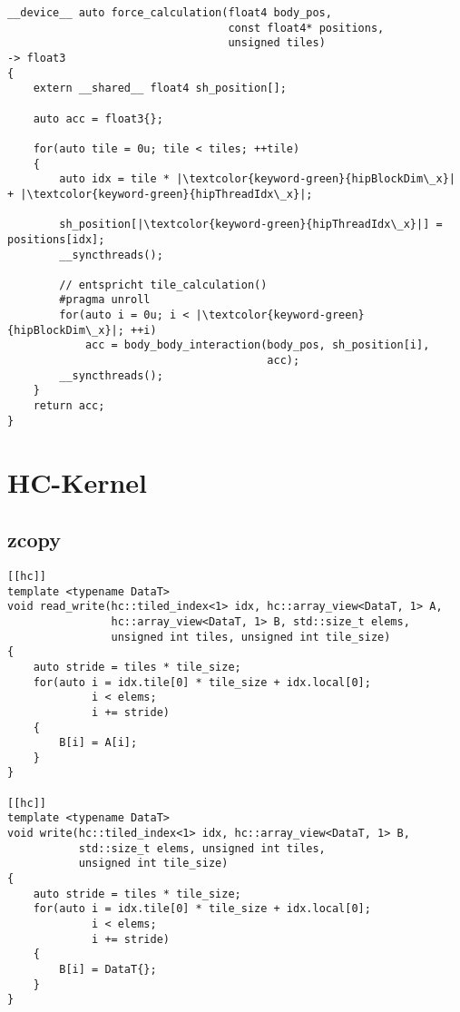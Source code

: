 \begin{code}
    \begin{verbatim}
__device__ auto force_calculation(float4 body_pos,
                                  const float4* positions,
                                  unsigned tiles)
-> float3
{
    extern __shared__ float4 sh_position[];

    auto acc = float3{};

    for(auto tile = 0u; tile < tiles; ++tile)
    {
        auto idx = tile * |\textcolor{keyword-green}{hipBlockDim\_x}| + |\textcolor{keyword-green}{hipThreadIdx\_x}|;

        sh_position[|\textcolor{keyword-green}{hipThreadIdx\_x}|] = positions[idx];
        __syncthreads();

        // entspricht tile_calculation()
        #pragma unroll
        for(auto i = 0u; i < |\textcolor{keyword-green}{hipBlockDim\_x}|; ++i)
            acc = body_body_interaction(body_pos, sh_position[i],
                                        acc);
        __syncthreads();
    }
    return acc;
}
    \end{verbatim}
    \caption{force\_calculation - HIP-Implementierung}
    \label{anhang:hip:forcecalculation}
\end{code}


\section{HC-Kernel}

\subsection{zcopy}

\begin{code}
    \begin{verbatim}
[[hc]]
template <typename DataT>
void read_write(hc::tiled_index<1> idx, hc::array_view<DataT, 1> A,
                hc::array_view<DataT, 1> B, std::size_t elems,
                unsigned int tiles, unsigned int tile_size)
{
    auto stride = tiles * tile_size;
    for(auto i = idx.tile[0] * tile_size + idx.local[0];
             i < elems;
             i += stride)
    {
        B[i] = A[i];
    }
}

[[hc]]
template <typename DataT>
void write(hc::tiled_index<1> idx, hc::array_view<DataT, 1> B,
           std::size_t elems, unsigned int tiles,
           unsigned int tile_size)
{
    auto stride = tiles * tile_size;
    for(auto i = idx.tile[0] * tile_size + idx.local[0];
             i < elems;
             i += stride)
    {
        B[i] = DataT{};
    }
}
    \end{verbatim}
    \caption{zcopy - HC-Implementierung}
    \label{anhang:hc:zcopy}
\end{code}

